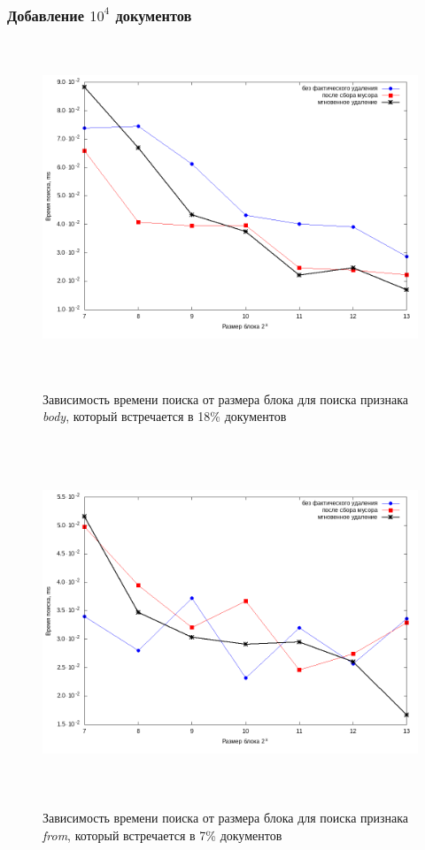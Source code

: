 \subsubsection{Добавление $10^4$ документов}

\begin{figure}[H]
\includegraphics[width=\linewidth, height=10cm]{fig/limit_1/1e4/body.png}
\caption{Зависимость времени поиска от размера блока для поиска признака \textit{body}, который встречается в 18\% документов}
\includegraphics[width=\linewidth, height=11cm]{fig/limit_1/1e4/from.png}
\caption{Зависимость времени поиска от размера блока для поиска признака \textit{from}, который встречается в 7\% документов}
\end{figure}

